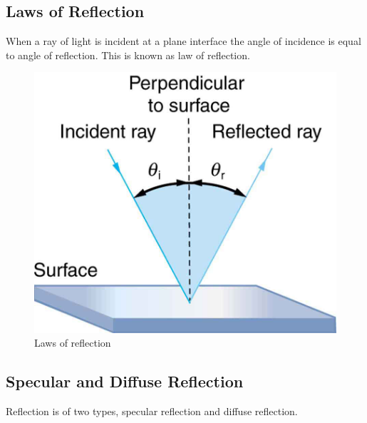 \documentclass[12pt]{book}
\begin{document}
\subsection*{Laws of Reflection}
When a ray of light is incident at a plane interface the angle of
incidence is equal to angle of reflection. This is known as law of
reflection.

\begin{figure}[h]
\includegraphics[scale=.70]{../lor1.jpeg}
\centering
\caption{Laws of reflection}
\end{figure}
\subsection*{Specular and Diffuse Reflection}
Reflection is of two types, specular reflection and diffuse reflection.
\end{document}
